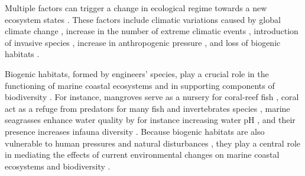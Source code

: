 \begin{refsection}
Multiple factors can trigger a change in ecological regime towards a new
ecosystem states \autocite{Rocha_2015b}. These factors include climatic
variations caused by global climate change \autocite{Rocha_2015b},
increase in the number of extreme climatic events
\autocite{Wernberg_2016}, introduction of invasive species
\autocite{Kotta_2018}, increase in anthropogenic pressure
\autocite{Halpern_2019}, and loss of biogenic habitats
\autocite{Airoldi_2008}.

Biogenic habitats, formed by engineers' species, play a crucial role in
the functioning of marine coastal ecosystems and in supporting
components of biodiversity \autocites[ ]{Vozzo_2023}{Albertson_2022}.
For instance, mangroves serve as a nursery for coral-reef fish
\autocite{Nagelkerken_2002}, coral act as a refuge from predators for
many fish and invertebrates species \autocite{Almany_2004}, marine
seagrasses enhance water quality by for instance increasing water pH
\autocite{Ricart_2021}, and their presence increases infauna diversity
\autocites[ ]{Gonzalez-Ortiz_2016}{Boye_2017}. Because biogenic habitats
are also vulnerable to human pressures and natural disturbances
\autocites[ ]{Airoldi_2007}[ ]{Butt_2022}{Wernberg_2023}, they play a
central role in mediating the effects of current environmental changes
on marine coastal ecosystems and biodiversity \autocites[
]{Sunday_2017}{Bulleri_2018}.


\end{refsection}
